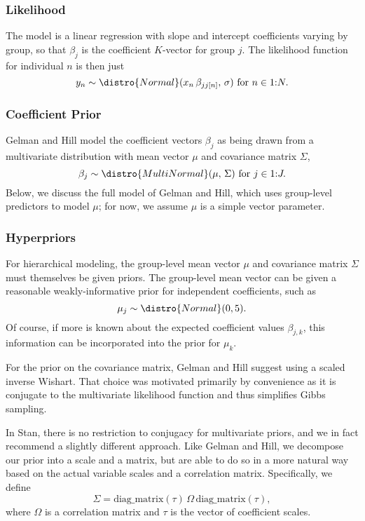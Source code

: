\subsubsection{Likelihood}

The model is a linear regression with slope and intercept coefficients
varying by group, so that $\beta_j$ is the coefficient $K$-vector for
group $j$.  The likelihood function for individual $n$ is then just
%
\[
y_n \sim \distro{Normal}(x_n \, \beta_{jj[n]}, \, \sigma) 
\mbox{ for } n \in 1{:}N.
\]
%

\subsubsection{Coefficient Prior}

Gelman and Hill model the coefficient vectors $\beta_j$ as being drawn
from a multivariate distribution with mean vector $\mu$ and
covariance matrix $\Sigma$,%
%
\[
\beta_j \sim \distro{MultiNormal}(\mu, \, \Sigma)
\mbox{ for } j \in 1{:}J.
\]
%
Below, we discuss the full model of Gelman and Hill, which uses
group-level predictors to model $\mu$; for now, we assume $\mu$ is a
simple vector parameter.

\subsubsection{Hyperpriors}

For hierarchical modeling, the group-level mean vector $\mu$ and
covariance matrix $\Sigma$ must themselves be given priors.  The
group-level mean vector can be given a reasonable weakly-informative
prior for independent coefficients, such as
%
\[
\mu_j \sim \distro{Normal}(0,5).
\]
Of course, if more is known about the expected coefficient values
$\beta_{j, k}$, this information can be incorporated into the prior for
$\mu_k$.  

For the prior on the covariance matrix, Gelman and Hill suggest using
a scaled inverse Wishart.  That choice was motivated primarily by
convenience as it is conjugate to the multivariate likelihood function
and thus simplifies Gibbs sampling.  

In Stan, there is no restriction to conjugacy for multivariate priors,
and we in fact recommend a slightly different approach.  Like Gelman
and Hill, we decompose our prior into a scale and a matrix, but are
able to do so in a more natural way based on the actual variable
scales and a correlation matrix.  Specifically, we define 
\[
\Sigma = \mbox{diag\_matrix}(\tau) \, \Omega \, \mbox{diag\_matrix}(\tau),
\]
where $\Omega$ is a correlation matrix and $\tau$ is the vector of
coefficient scales.  


